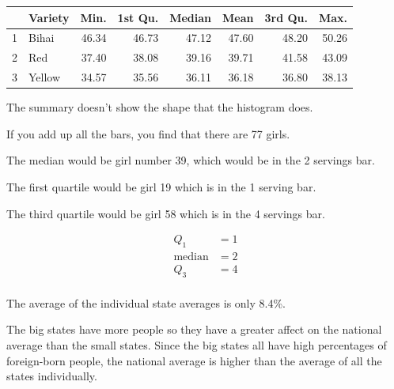 \documentclass[letterpaper, landscape]{exam}
\begin{document}
\begin{description}
        \begin{table}[H]
          \centering
          \begin{tabular}{rlrrrrrr}
            \toprule
              & Variety & Min.  & 1st Qu. & Median & Mean  & 3rd Qu. & Max. \\
            \midrule
            1 & Bihai   & 46.34 & 46.73   & 47.12  & 47.60 & 48.20   & 50.26 \\
            2 & Red     & 37.40 & 38.08   & 39.16  & 39.71 & 41.58   & 43.09 \\
            3 & Yellow  & 34.57 & 35.56   & 36.11  & 36.18 & 36.80   & 38.13 \\
            \bottomrule
          \end{tabular}
        \end{table}

        The summary doesn't show the shape that the histogram does.

      \newpage

      \item[30]
        If you add up all the bars, you find that there are 77 girls.  
        
        \begin{itemize*}
          \item The median would be girl number 39, which would be in the 2 servings bar.  
          \item The first quartile would be girl 19 which is in the 1 serving bar.
          \item The third quartile would be girl 58 which is in the 4 servings bar.  
        \end{itemize*}

        \begin{align*}
          Q_1           & = 1 \\
          \text{median} & = 2 \\
          Q_3           & = 4 \\
        \end{align*}

      \item[37]
        The average of the individual state averages is only 8.4\%.

        The big states have more people so they have a greater affect on the
        national average than the small states.  Since the big states all have
        high percentages of foreign-born people, the national average is higher
        than the average of all the states individually.


\end{description}
\end{document}
